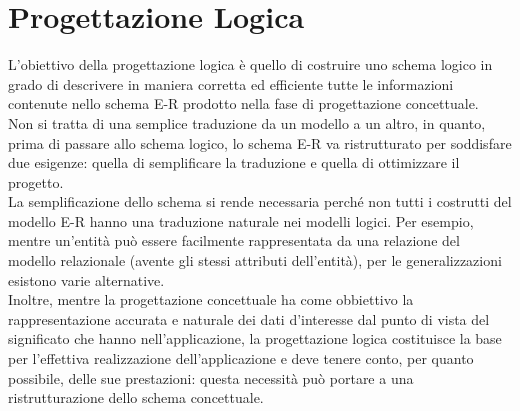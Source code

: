 \chapter{Progettazione Logica}
L'obiettivo della progettazione logica è quello di costruire uno schema logico in grado di descrivere in maniera corretta ed efficiente tutte le informazioni contenute nello schema E-R prodotto nella fase di progettazione concettuale.\\
Non si tratta di una semplice traduzione da un modello a un altro, in quanto, prima di passare allo schema logico, lo schema E-R va ristrutturato per soddisfare due esigenze: quella di semplificare la traduzione e quella di ottimizzare il progetto.\\
La semplificazione dello schema si rende necessaria perché non tutti i costrutti del modello E-R hanno una traduzione naturale nei modelli logici. Per esempio, mentre un'entità può essere facilmente rappresentata da una relazione del modello relazionale (avente gli stessi attributi dell'entità), per le generalizzazioni esistono varie alternative.\\
Inoltre, mentre la progettazione concettuale ha come obbiettivo la rappresentazione accurata e naturale dei dati d'interesse dal punto di vista del significato che hanno nell'applicazione, la progettazione logica costituisce la base per l'effettiva realizzazione dell'applicazione e deve tenere conto, per quanto possibile, delle sue prestazioni: questa necessità può portare a una ristrutturazione dello schema concettuale.




